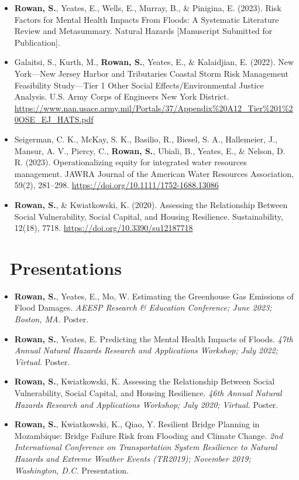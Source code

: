 \documentclass[11pt,a4paper,]{sr-awesome-cv}
\begin{document}
\begin{itemize}
\item
  \textbf{Rowan, S.}, Yeates, E., Wells, E., Murray, B., \& Pinigina, E.
  (2023). Risk Factors for Mental Health Impacts From Floods: A
  Systematic Literature Review and Metasummary. Natural Hazards
  {[}Manuscript Submitted for Publication{]}.
\item
  Galaitsi, S., Kurth, M., \textbf{Rowan, S.}, Yeates, E., \&
  Kalaidjian, E. (2022). New York---New Jersey Harbor and Tributaries
  Coastal Storm Risk Management Feasibility Study---Tier 1 Other Social
  Effects/Environmental Justice Analysis. U.S. Army Corps of Engineers
  New York District.
  \url{https://www.nan.usace.army.mil/Portals/37/Appendix\%20A12_Tier\%201\%20OSE_EJ_HATS.pdf}
\item
  Seigerman, C. K., McKay, S. K., Basilio, R., Biesel, S. A.,
  Hallemeier, J., Mansur, A. V., Piercy, C., \textbf{Rowan, S.}, Ubiali,
  B., Yeates, E., \& Nelson, D. R. (2023). Operationalizing equity for
  integrated water resources management. JAWRA Journal of the American
  Water Resources Association, 59(2), 281--298.
  \url{https://doi.org/10.1111/1752-1688.13086}
\item
  \textbf{Rowan, S.}, \& Kwiatkowski, K. (2020). Assessing the
  Relationship Between Social Vulnerability, Social Capital, and Housing
  Resilience. Sustainability, 12(18), 7718.
  \url{https://doi.org/10.3390/su12187718}
\end{itemize}

\normalsize

\hypertarget{presentations}{%
\section{\faUser~Presentations}\label{presentations}}

\footnotesize

\begin{itemize}
\item
  \textbf{Rowan, S.}, Yeates, E., Mo, W. Estimating the Greenhouse Gas
  Emissions of Flood Damages. \emph{AEESP Research \& Education
  Conference; June 2023; Boston, MA.} Poster.
\item
  \textbf{Rowan, S.}, Yeates, E. Predicting the Mental Health Impacts of
  Floods. \emph{47th Annual Natural Hazards Research and Applications
  Workshop; July 2022; Virtual.} Poster.
\item
  \textbf{Rowan, S.}, Kwiatkowski, K. Assessing the Relationship Between
  Social Vulnerability, Social Capital, and Housing Resilience.
  \emph{46th Annual Natural Hazards Research and Applications Workshop;
  July 2020; Virtual.} Poster.
\item
  \textbf{Rowan, S.}, Kwiatkowski, K., Qiao, Y. Resilient Bridge
  Planning in Mozambique: Bridge Failure Risk from Flooding and Climate
  Change. \emph{2nd International Conference on Transportation System
  Resilience to Natural Hazards and Extreme Weather Events (TR2019);
  November 2019; Washington, D.C.} Presentation.
\end{itemize}

\normalsize
\end{document}
